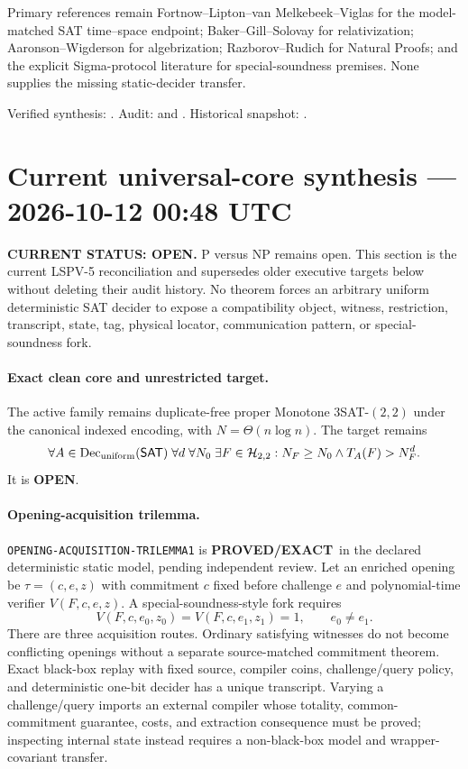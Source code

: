 \documentclass[11pt]{article}
\newcommand{\statusproved}{\textcolor{proved}{\textbf{PROVED/EXACT}}}
\newcommand{\statusopen}{\textcolor{openstatus}{\textbf{OPEN}}}
\begin{document}
Primary references remain Fortnow--Lipton--van Melkebeek--Viglas for the
model-matched SAT time--space endpoint; Baker--Gill--Solovay for
relativization; Aaronson--Wigderson for algebrization; Razborov--Rudich for
Natural Proofs; and the explicit Sigma-protocol literature for
special-soundness premises. None supplies the missing static-decider transfer.

Verified synthesis:
.
Audit:
 and
.
Historical snapshot:
.

\clearpage

\section{Current universal-core synthesis --- 2026-10-12 00:48 UTC}

\begin{statusbox}
\textbf{CURRENT STATUS: OPEN.} P versus NP remains open. This section is the
current LSPV-5 reconciliation and supersedes older executive targets below
without deleting their audit history. No theorem forces an arbitrary uniform
deterministic SAT decider to expose a compatibility object, witness,
restriction, transcript, state, tag, physical locator, communication pattern,
or special-soundness fork.
\end{statusbox}

\paragraph{Exact clean core and unrestricted target.}
The active family remains duplicate-free proper Monotone $3$SAT-$(2,2)$ under
the canonical indexed encoding, with $N=\Theta(n\log n)$. The target remains
\[
 \forall A\in\operatorname{Dec}_{\rm uniform}(\mathsf{SAT})\;
 \forall d\;\forall N_0\;\exists F\in\mathcal H_{2,2}:
 N_F\ge N_0\land T_A(F)>N_F^d.
\]
It is \statusopen.

\paragraph{Opening-acquisition trilemma.}
\texttt{OPENING-ACQUISITION-TRILEMMA1} is \statusproved\ in the declared
deterministic static model, pending independent review.  Let an enriched
opening be $\tau=(c,e,z)$ with commitment $c$ fixed before challenge $e$ and
polynomial-time verifier $V(F,c,e,z)$.  A special-soundness-style fork requires
\[
 V(F,c,e_0,z_0)=V(F,c,e_1,z_1)=1,\qquad e_0\ne e_1.
\]
There are three acquisition routes.  Ordinary satisfying witnesses do not
become conflicting openings without a separate source-matched commitment
theorem.  Exact black-box replay with fixed source, compiler coins,
challenge/query policy, and deterministic one-bit decider has a unique
transcript.  Varying a challenge/query imports an external compiler whose
totality, common-commitment guarantee, costs, and extraction consequence must
be proved; inspecting internal state instead requires a non-black-box model
and wrapper-covariant transfer.
\end{document}
